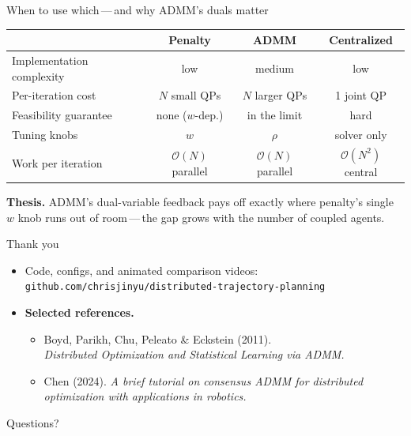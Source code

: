 \documentclass[aspectratio=169,11pt]{beamer}
\begin{document}
\begin{frame}{When to use which\,---\,and why ADMM's duals matter}
  \begin{center}\small
    \begin{tabular}{@{}lccc@{}}
      \toprule
                                 & \textbf{Penalty} & \textbf{ADMM}       & \textbf{Centralized} \\
      \midrule
      Implementation complexity  & low              & medium              & low \\
      Per-iteration cost         & $N$ small QPs    & $N$ larger QPs      & 1 joint QP \\
      Feasibility guarantee      & none ($w$-dep.)  & in the limit        & hard \\
      Tuning knobs               & $w$              & $\rho$              & solver only \\
      Work per iteration         & $\mathcal{O}(N)$ parallel & $\mathcal{O}(N)$ parallel & $\mathcal{O}(N^2)$ central \\
      \bottomrule
    \end{tabular}
  \end{center}
  \vspace{0.8em}
  \begin{center}
    \textbf{Thesis.} ADMM's dual-variable feedback pays off exactly where
    penalty's single $w$ knob runs out of room\,---\,the gap grows with
    the number of coupled agents.
  \end{center}
\end{frame}

\begin{frame}{Thank you}
  \begin{itemize}
    \item Code, configs, and animated comparison videos:\\
          \texttt{github.com/chrisjinyu/distributed-trajectory-planning}
    \item \textbf{Selected references.}
          \begin{itemize}\footnotesize
            \item Boyd, Parikh, Chu, Peleato \& Eckstein (2011).\\
                  \emph{Distributed Optimization and Statistical
                  Learning via ADMM.}
            \item Chen (2024). \emph{A brief tutorial on consensus ADMM
                  for distributed optimization with applications in
                  robotics.}
          \end{itemize}
  \end{itemize}
  \vspace{1.0em}
  \begin{center}
    \Large Questions?
  \end{center}
\end{frame}
\end{document}
